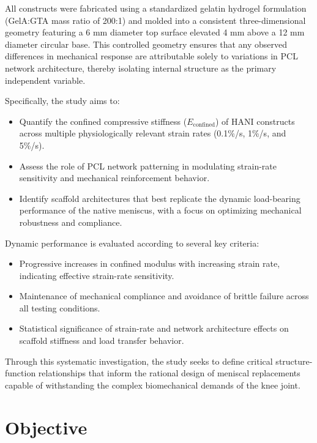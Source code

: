 All constructs were fabricated using a standardized gelatin hydrogel formulation (GelA:GTA mass ratio of 200:1) and molded into a consistent three-dimensional geometry featuring a 6 mm diameter top surface elevated 4 mm above a 12 mm diameter circular base. This controlled geometry ensures that any observed differences in mechanical response are attributable solely to variations in PCL network architecture, thereby isolating internal structure as the primary independent variable.

Specifically, the study aims to:

\begin{itemize}
    \item Quantify the confined compressive stiffness ($E_{\text{confined}}$) of HANI constructs across multiple physiologically relevant strain rates (0.1\%/s, 1\%/s, and 5\%/s).
    \item Assess the role of PCL network patterning in modulating strain-rate sensitivity and mechanical reinforcement behavior.
    \item Identify scaffold architectures that best replicate the dynamic load-bearing performance of the native meniscus, with a focus on optimizing mechanical robustness and compliance.
\end{itemize}

Dynamic performance is evaluated according to several key criteria:

\begin{itemize}
    \item Progressive increases in confined modulus with increasing strain rate, indicating effective strain-rate sensitivity.
    \item Maintenance of mechanical compliance and avoidance of brittle failure across all testing conditions.
    \item Statistical significance of strain-rate and network architecture effects on scaffold stiffness and load transfer behavior.
\end{itemize}

Through this systematic investigation, the study seeks to define critical structure-function relationships that inform the rational design of meniscal replacements capable of withstanding the complex biomechanical demands of the knee joint.



\section{Objective}

